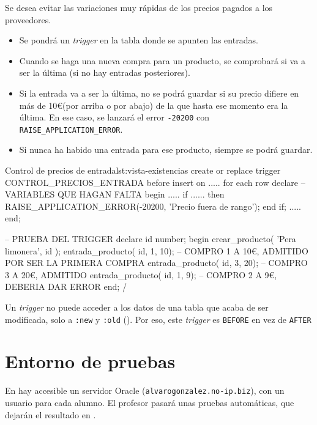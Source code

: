 \begin{homeworkProblem}

  Se desea evitar las variaciones muy rápidas de los precios pagados a los proveedores.
  \begin{itemize}
  \item Se pondrá un \textit{trigger} en la tabla donde se apunten las entradas.
  \item Cuando se haga una nueva compra para un producto, se comprobará si va a ser la última (si no hay entradas posteriores).
  \item Si la entrada va a ser la última, no se podrá guardar si su precio difiere en más de 10\euro (por arriba o por abajo) de la que hasta ese momento era la última. En ese caso, se lanzará el error \texttt{-20200} con \texttt{RAISE\_APPLICATION\_ERROR}.
  \item Si nunca ha habido una entrada para ese producto, siempre se podrá guardar.
  \end{itemize}

\begin{listadosql}{Control de precios de entrada}{lst:vista-existencias}
create or replace trigger CONTROL_PRECIOS_ENTRADA
before insert on .....
for each row 
declare
-- VARIABLES QUE HAGAN FALTA
begin
.....
if ...... then
RAISE_APPLICATION_ERROR(-20200, 'Precio fuera de rango');
end if;
.....
end;

-- PRUEBA DEL TRIGGER
declare
id number;
begin
crear_producto( 'Pera limonera', id );
entrada_producto( id, 1, 10); -- COMPRO 1 A 10€, ADMITIDO POR SER LA PRIMERA COMPRA
entrada_producto( id, 3, 20); -- COMPRO 3 A 20€, ADMITIDO
entrada_producto( id, 1, 9); -- COMPRO 2 A 9€, DEBERIA DAR ERROR
end;
/
\end{listadosql}  

  \begin{Aviso}
    Un \textit{trigger} no puede acceder a los datos de una tabla que acaba de ser modificada, solo a \texttt{:new} y \texttt{:old} (). Por eso, este \textit{trigger} es \texttt{BEFORE} en vez de \texttt{AFTER}
  \end{Aviso}


\end{homeworkProblem}


\section{Entorno de pruebas}
En hay accesible un servidor Oracle (\texttt{alvarogonzalez.no-ip.biz}), con un usuario para cada alumno.
El profesor pasará unas pruebas automáticas, que dejarán el resultado en .

